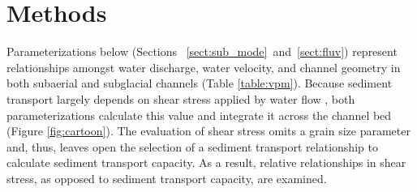 \documentclass[11pt]{article}
\begin{document}
\section{Methods}
\label{sect:meth}
Parameterizations below (Sections ~\ref{sect:sub_mode}~and~\ref{sect:fluv}) represent relationships amongst water discharge, water velocity, and channel geometry in both subaerial and subglacial channels (Table \ref{table:vpm}).
Because sediment transport largely depends on shear stress applied by water flow \citep{shields1936}, both parameterizations calculate this value and integrate  it across the channel bed (Figure \ref{fig:cartoon}).
The evaluation of shear stress omits a grain size parameter and, thus, leaves open the selection of a sediment transport relationship  \citep[e.g.][]{shields1936,meyer1948} to  calculate sediment transport capacity.
As a result, relative relationships in shear stress, as opposed to sediment transport capacity, are examined.
\end{document}
